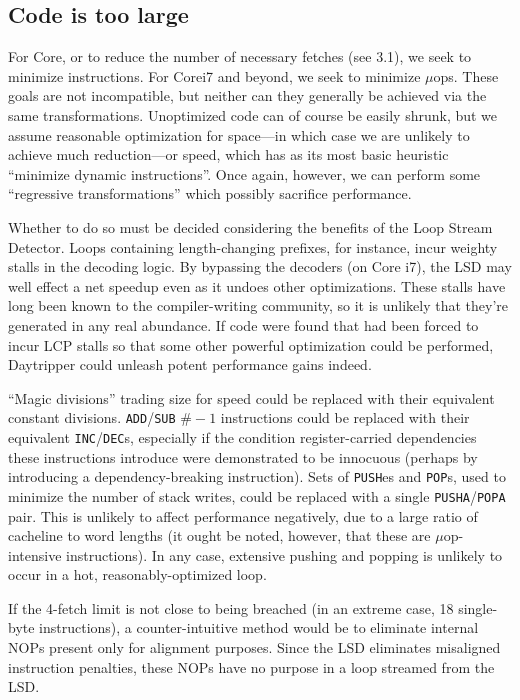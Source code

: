 \documentclass[]{sigplanconf}
\begin{document}
\subsection{Code is too large} For Core, or to reduce the number
of necessary fetches (see 3.1), we seek to minimize instructions. For Core\texttrademark i7
and beyond, we seek to minimize $\mu$ops. These goals are not incompatible,
but neither can they generally be achieved via the same transformations.
Unoptimized code can of course be easily shrunk, but we assume reasonable
optimization for space---in which case we are unlikely to achieve much
reduction---or speed, which has as its most basic heuristic ``minimize dynamic
instructions''. Once again, however, we can perform some ``regressive transformations''
which possibly sacrifice performance.

Whether to do so must be decided considering the benefits of the Loop Stream
Detector. Loops containing length-changing prefixes, for instance, incur weighty
stalls in the decoding logic. By bypassing the decoders (on Core\texttrademark
i7), the LSD may well effect a net speedup even as it undoes other optimizations.
These stalls have long been known to the compiler-writing community, so it is
unlikely that they're generated in any real abundance. If code were found that
had been forced to incur LCP stalls so that some other powerful optimization
could be performed, Daytripper could unleash potent performance gains indeed.

``Magic divisions'' trading size for speed \cite{knuth2} could be replaced
with their equivalent constant divisions. \texttt{ADD}/\texttt{SUB} $\#-1$ instructions
could be replaced with their equivalent \texttt{INC}/\texttt{DEC}s, especially
if the condition register-carried dependencies these instructions introduce
were demonstrated to be innocuous (perhaps by introducing a dependency-breaking
instruction). Sets of \texttt{PUSH}es and \texttt{POP}s, used
to minimize the number of stack writes, could be replaced with a single
\texttt{PUSHA}/\texttt{POPA} pair. This is unlikely to affect performance negatively,
due to a large ratio of cacheline to word lengths (it ought be noted, however,
that these are $\mu$op-intensive instructions). In any case, extensive pushing
and popping is unlikely to occur in a hot, reasonably-optimized loop.

If the 4-fetch limit is not close to being breached (in an extreme case, 18
single-byte instructions), a counter-intuitive method would be to eliminate
internal NOPs present only for alignment purposes. Since the LSD eliminates
misaligned instruction penalties, these NOPs have no purpose in a loop
streamed from the LSD.
\end{document}
